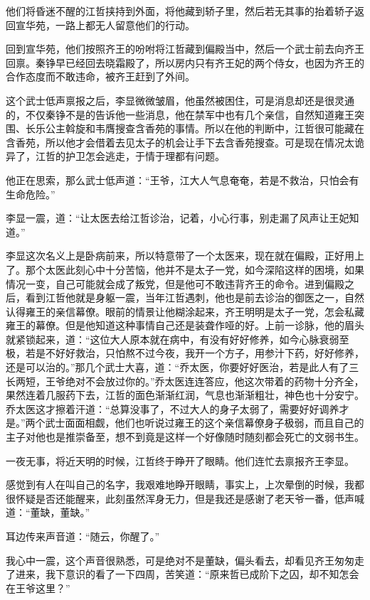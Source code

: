 他们将昏迷不醒的江哲挟持到外面，将他藏到轿子里，然后若无其事的抬着轿子返回宣华苑，一路上都无人留意他们的行动。

回到宣华苑，他们按照齐王的吩咐将江哲藏到偏殿当中，然后一个武士前去向齐王回禀。秦铮早已经回去晓霜殿了，所以房内只有齐王妃的两个侍女，也因为齐王的合作态度而不敢违命，被齐王赶到了外间。

这个武士低声禀报之后，李显微微皱眉，他虽然被困住，可是消息却还是很灵通的，不仅秦铮不是的告诉他一些消息，他在禁军中也有几个亲信，自然知道雍王突围、长乐公主斡旋和韦膺搜查含香苑的事情。所以在他的判断中，江哲很可能藏在含香苑，所以他才会借着去见太子的机会让手下去含香苑搜查。可是现在情况太诡异了，江哲的护卫怎会逃走，于情于理都有问题。

他正在思索，那么武士低声道：“王爷，江大人气息奄奄，若是不救治，只怕会有生命危险。”

李显一震，道：“让太医去给江哲诊治，记着，小心行事，别走漏了风声让王妃知道。”

李显这次名义上是卧病前来，所以特意带了一个太医来，现在就在偏殿，正好用上了。那个太医此刻心中十分苦恼，他并不是太子一党，如今深陷这样的困境，如果情况一变，自己可能就会成了叛党，但是他可不敢违背齐王的命令。进到偏殿之后，看到江哲他就是身躯一震，当年江哲遇刺，他也是前去诊治的御医之一，自然认得雍王的亲信幕僚。眼前的情景让他糊涂起来，齐王明明是太子一党，怎会私藏雍王的幕僚。但是他知道这种事情自己还是装聋作哑的好。上前一诊脉，他的眉头就紧锁起来，道：“这位大人原本就在病中，有没有好好修养，如今心脉衰弱至极，若是不好好救治，只怕熬不过今夜，我开一个方子，用参汁下药，好好修养，还是可以治的。”那几个武士大喜，道：“乔太医，你要好好医治，若是此人有了三长两短，王爷绝对不会放过你的。”乔太医连连答应，他这次带着的药物十分齐全，果然连着几服药下去，江哲的面色渐渐红润，气息也渐渐粗壮，神色也十分安宁。乔太医这才擦着汗道：“总算没事了，不过大人的身子太弱了，需要好好调养才是。”两个武士面面相觑，他们也听说过雍王的这个亲信幕僚身子极弱，而且自己的主子对他也是推崇备至，想不到竟是这样一个好像随时随刻都会死亡的文弱书生。

一夜无事，将近天明的时候，江哲终于睁开了眼睛。他们连忙去禀报齐王李显。

感觉到有人在叫自己的名字，我艰难地睁开眼睛，事实上，上次晕倒的时候，我都很怀疑是否还能醒来，此刻虽然浑身无力，但是我还是感谢了老天爷一番，低声喊道：“董缺，董缺。”

耳边传来声音道：“随云，你醒了。”

我心中一震，这个声音很熟悉，可是绝对不是董缺，偏头看去，却看见齐王匆匆走了进来，我下意识的看了一下四周，苦笑道：“原来哲已成阶下之囚，却不知怎会在王爷这里？”

